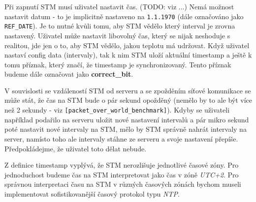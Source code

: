 Při zapnutí STM musí uživatel nastavit čas. (TODO: viz ...)
Nemá možnost nastavit datum - to je implicitně nastaveno na \texttt{1.1.1970} (dále označováno jako \texttt{REF\_DATE}).
Je to nutné kvůli tomu, aby STM vědělo který interval je zrovna nastavený.
Uživatel může nastavit libovolný čas, který se nijak neshoduje s realitou, jde jen o to,
aby STM vědělo, jakou teplotu má udržovat.
Když uživatel nastaví config data (intervaly), tak k nim STM uloží aktuální timestamp
a ještě k tomu příznak, který značí, že timestamp je synchronizovaný.
Tento příznak budeme dále označovat jako \textbf{correct\_bit}.

V souvislosti se vzdáleností STM od serveru a se zpožděním síťové komunikace se může
stát, že čas na STM bude o pár sekund opožděný (nemělo by to ale být více než 2 sekundy -
viz \texttt{[packet\_over\_world\_benchmark]}).
Kdyby se uživateli například podařilo na serveru uložit nové nastavení intervalů
a pár mikro sekund poté nastavit nové intervaly na STM, mělo by STM správně nahrát
intervaly na server, namísto toho ale intervaly stáhne ze serveru a svoje nastavení přepíše.
Předpokládejme, že uživatel toto dělat nebude.

Z definice timestamp vyplývá, že STM nerozlišuje jednotlivé časové zóny.
Pro jednoduchost budeme čas na STM interpretovat jako čas v zóně \emph{UTC+2}.
Pro správnou interpretaci času na STM v různých časových zónách bychom museli implementovat
sofistikovanější časový protokol typu \emph{NTP}.
